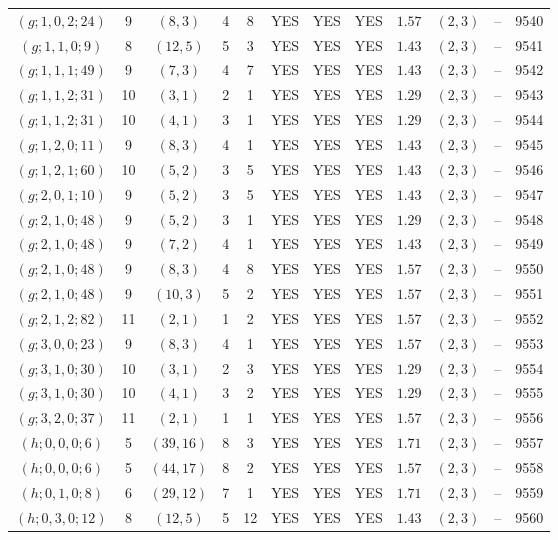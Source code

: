 \begin{longtable}{|c|c|c|c|c|c|c|c|c|c|c|c|}
$(g;1,0,2;24)$ & 9 & $(8,3)$ & 4 & 8 & YES & YES & YES & $1.57$ & $(2,3)$ & -- & 9540\\
$(g;1,1,0;9)$ & 8 & $(12,5)$ & 5 & 3 & YES & YES & YES & $1.43$ & $(2,3)$ & -- & 9541\\
$(g;1,1,1;49)$ & 9 & $(7,3)$ & 4 & 7 & YES & YES & YES & $1.43$ & $(2,3)$ & -- & 9542\\
$(g;1,1,2;31)$ & 10 & $(3,1)$ & 2 & 1 & YES & YES & YES & $1.29$ & $(2,3)$ & -- & 9543\\
$(g;1,1,2;31)$ & 10 & $(4,1)$ & 3 & 1 & YES & YES & YES & $1.29$ & $(2,3)$ & -- & 9544\\
$(g;1,2,0;11)$ & 9 & $(8,3)$ & 4 & 1 & YES & YES & YES & $1.43$ & $(2,3)$ & -- & 9545\\
$(g;1,2,1;60)$ & 10 & $(5,2)$ & 3 & 5 & YES & YES & YES & $1.43$ & $(2,3)$ & -- & 9546\\
$(g;2,0,1;10)$ & 9 & $(5,2)$ & 3 & 5 & YES & YES & YES & $1.43$ & $(2,3)$ & -- & 9547\\
$(g;2,1,0;48)$ & 9 & $(5,2)$ & 3 & 1 & YES & YES & YES & $1.29$ & $(2,3)$ & -- & 9548\\
$(g;2,1,0;48)$ & 9 & $(7,2)$ & 4 & 1 & YES & YES & YES & $1.43$ & $(2,3)$ & -- & 9549\\
$(g;2,1,0;48)$ & 9 & $(8,3)$ & 4 & 8 & YES & YES & YES & $1.57$ & $(2,3)$ & -- & 9550\\
$(g;2,1,0;48)$ & 9 & $(10,3)$ & 5 & 2 & YES & YES & YES & $1.57$ & $(2,3)$ & -- & 9551\\
$(g;2,1,2;82)$ & 11 & $(2,1)$ & 1 & 2 & YES & YES & YES & $1.57$ & $(2,3)$ & -- & 9552\\
$(g;3,0,0;23)$ & 9 & $(8,3)$ & 4 & 1 & YES & YES & YES & $1.57$ & $(2,3)$ & -- & 9553\\
$(g;3,1,0;30)$ & 10 & $(3,1)$ & 2 & 3 & YES & YES & YES & $1.29$ & $(2,3)$ & -- & 9554\\
$(g;3,1,0;30)$ & 10 & $(4,1)$ & 3 & 2 & YES & YES & YES & $1.29$ & $(2,3)$ & -- & 9555\\
$(g;3,2,0;37)$ & 11 & $(2,1)$ & 1 & 1 & YES & YES & YES & $1.57$ & $(2,3)$ & -- & 9556\\
$(h;0,0,0;6)$ & 5 & $(39,16)$ & 8 & 3 & YES & YES & YES & $1.71$ & $(2,3)$ & -- & 9557\\
$(h;0,0,0;6)$ & 5 & $(44,17)$ & 8 & 2 & YES & YES & YES & $1.57$ & $(2,3)$ & -- & 9558\\
$(h;0,1,0;8)$ & 6 & $(29,12)$ & 7 & 1 & YES & YES & YES & $1.71$ & $(2,3)$ & -- & 9559\\
$(h;0,3,0;12)$ & 8 & $(12,5)$ & 5 & 12 & YES & YES & YES & $1.43$ & $(2,3)$ & -- & 9560\\

\end{longtable}
